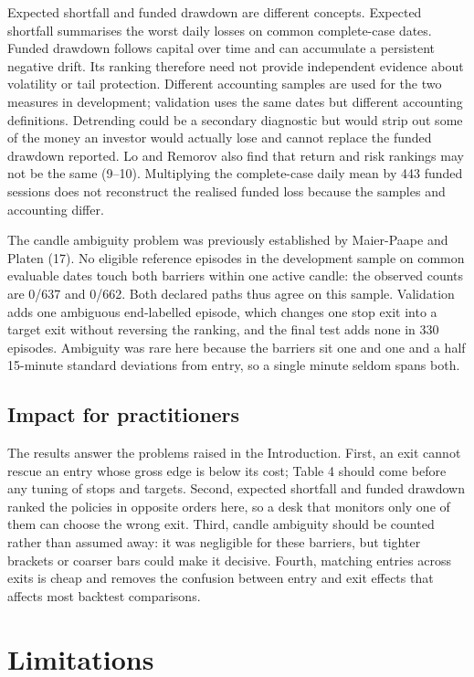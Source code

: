 \documentclass[11pt,a4paper]{article}
\begin{document}
Expected shortfall and funded drawdown are different concepts. Expected shortfall summarises the worst daily losses on common complete-case dates. Funded drawdown follows capital over time and can accumulate a persistent negative drift. Its ranking therefore need not provide independent evidence about volatility or tail protection. Different accounting samples are used for the two measures in development; validation uses the same dates but different accounting definitions. Detrending could be a secondary diagnostic but would strip out some of the money an investor would actually lose and cannot replace the funded drawdown reported. Lo and Remorov also find that return and risk rankings may not be the same (9--10). Multiplying the complete-case daily mean by 443 funded sessions does not reconstruct the realised funded loss because the samples and accounting differ.

The candle ambiguity problem was previously established by Maier-Paape and Platen (17). No eligible reference episodes in the development sample on common evaluable dates touch both barriers within one active candle: the observed counts are 0/637 and 0/662. Both declared paths thus agree on this sample. Validation adds one ambiguous end-labelled episode, which changes one stop exit into a target exit without reversing the ranking, and the final test adds none in 330 episodes. Ambiguity was rare here because the barriers sit one and one and a half 15-minute standard deviations from entry, so a single minute seldom spans both.

\subsection*{Impact for practitioners}

The results answer the problems raised in the Introduction. First, an exit cannot rescue an entry whose gross edge is below its cost; Table 4 should come before any tuning of stops and targets. Second, expected shortfall and funded drawdown ranked the policies in opposite orders here, so a desk that monitors only one of them can choose the wrong exit. Third, candle ambiguity should be counted rather than assumed away: it was negligible for these barriers, but tighter brackets or coarser bars could make it decisive. Fourth, matching entries across exits is cheap and removes the confusion between entry and exit effects that affects most backtest comparisons.


\section*{Limitations}
\end{document}
